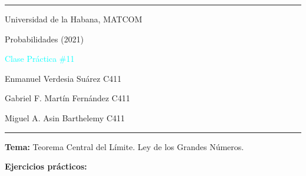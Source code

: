 \documentclass[a4paper,11pt]{article}
\begin{document}
\begin{center}
\large{
\rule{\textwidth}{0.5pt}
\par Universidad de la Habana, MATCOM
\par Probabilidades (2021)
\vspace{0.4cm}
\par \textcolor{cyan}{Clase Pr\'actica \#11}
\par Enmanuel Verdesia Suárez C411
\par Gabriel F. Mart\'in Fern\'andez C411
\par Miguel A. Asin Barthelemy C411
\rule{\textwidth}{1.5pt}
}

\par \textbf{Tema:} Teorema Central del L\'imite. Ley de los Grandes N\'umeros.
\end{center}

\vspace{0.5cm}
\textbf{Ejercicios pr\'acticos:}
\end{document}
